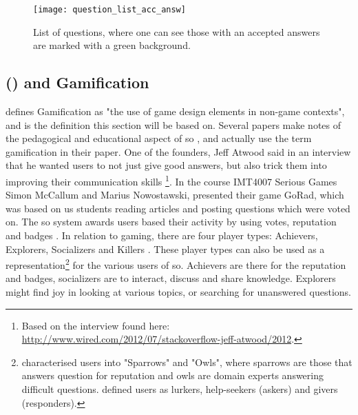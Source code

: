 \begin{figure}[ht]
	\centering
	\texttt{[image: question\_list\_acc\_answ]}
	\caption{List of questions, where one can see those with an accepted answers are marked with a green background.}
	\label{fig:question_list_acc_answ}
\end{figure}

\subsection[Stack Overflow and Gamification]{ () and Gamification}
\label{sec:stackoverflow_gamification}
\textcite{Deterding2011} defines Gamification as "the use of game design elements in non-game contexts", and is the definition this section will be based on. 
Several papers make notes of the pedagogical and educational aspect of \gls{so} \cite{Nasehi2012, Posnett2012, Yang2014}, and \cite{Nasehi2012, Yang2014} actually use the term gamification in their paper.
One of the founders, Jeff Atwood said in an interview that he wanted users to not just give good answers, but also trick them into improving their communication skills \cite{Posnett2012}\footnote{
	Based on the interview found here: \\ 
	\url{http://www.wired.com/2012/07/stackoverflow-jeff-atwood/2012}.
	}.
In the course IMT4007 Serious Games Simon McCallum and Marius Nowostawski, presented their game GoRad, which was based on us students reading articles and posting questions which were voted on. 
The \gls{so} system awards users based their activity by using votes, reputation and badges \cite{M.Sewak2010, Movshovitz-Attias2013, Treude2011, StackOverflow.com2016, StackOverflow.com2016d}.
In relation to gaming, there are four player types: Achievers, Explorers, Socializers and Killers \cite[p.~3]{Maan2013}.
\vspace{0.5em}\newline
These player types can also be used as a representation\footnote{	
	\textcite{Yang2014} characterised users into "Sparrows" and "Owls", where sparrows are those that answers question for reputation and owls are domain experts answering difficult questions. 
	\textcite[p.~2]{Ahmed2015} defined users as lurkers, help-seekers (askers) and givers (responders).	
	} for the various users of \gls{so}. 
Achievers are there for the reputation and badges, socializers are to interact, discuss and share knowledge. 
Explorers might find joy in looking at various topics, or searching for unanswered questions.
